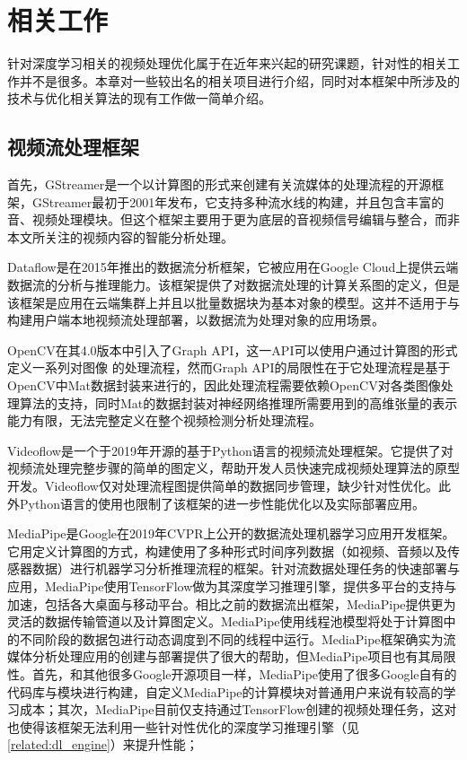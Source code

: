 
\chapter{相关工作}\label{related_work}
针对深度学习相关的视频处理优化属于在近年来兴起的研究课题，针对性的相关工作并不是很多。本章对一些较出名的相关项目进行介绍，同时对本框架中所涉及的技术与优化相关算法的现有工作做一简单介绍。

\section{视频流处理框架}
首先，GStreamer\cite{gstreamer}是一个以计算图的形式来创建有关流媒体的处理流程的开源框架，GStreamer最初于2001年发布，它支持多种流水线的构建，并且包含丰富的音、视频处理模块。但这个框架主要用于更为底层的音视频信号编辑与整合，而非本文所关注的视频内容的智能分析处理。\par
Dataflow\cite{akidau2015dataflow}是在2015年推出的数据流分析框架，它被应用在Google Cloud上提供云端数据流的分析与推理能力。该框架提供了对数据流处理的计算关系图的定义，但是该框架是应用在云端集群上并且以批量数据块为基本对象的模型。这并不适用于与构建用户端本地视频流处理部署，以数据流为处理对象的应用场景。\par 
OpenCV在其4.0版本中引入了Graph API\cite{matveev2018opencv}，这一API可以使用户通过计算图的形式定义一系列对图像
的处理流程，然而Graph API的局限性在于它处理流程是基于OpenCV中Mat数据封装来进行的，因此处理流程需要依赖OpenCV对各类图像处理算法的支持，同时Mat的数据封装对神经网络推理所需要用到的高维张量的表示能力有限，无法完整定义在整个视频检测分析处理流程。\par
Videoflow\cite{deArmas2019videoflow}是一个于2019年开源的基于Python语言的视频流处理框架。它提供了对视频流处理完整步骤的简单的图定义，帮助开发人员快速完成视频处理算法的原型开发。Videoflow仅对处理流程图提供简单的数据同步管理，缺少针对性优化。此外Python语言的使用也限制了该框架的进一步性能优化以及实际部署应用。\par
MediaPipe\cite{lugaresi2019mediapipe}是Google在2019年CVPR上公开的数据流处理机器学习应用开发框架。
它用定义计算图的方式，构建使用了多种形式时间序列数据（如视频、音频以及传感器数据）进行机器学习分析推理流程的框架。针对流数据处理任务的快速部署与应用，MediaPipe使用TensorFlow\cite{abadi2016tensorflow}做为其深度学习推理引擎，提供多平台的支持与加速，包括各大桌面与移动平台。相比之前的数据流出框架，MediaPipe提供更为灵活的数据传输管道以及计算图定义。MediaPipe使用线程池模型将处于计算图中的不同阶段的数据包进行动态调度到不同的线程中运行。MediaPipe框架确实为流媒体分析处理应用的创建与部署提供了很大的帮助，但MediaPipe项目也有其局限性。首先，和其他很多Google开源项目一样，MediaPipe使用了很多Google自有的代码库与模块进行构建，自定义MediaPipe的计算模块对普通用户来说有较高的学习成本；其次，MediaPipe目前仅支持通过TensorFlow创建的视频处理任务，这对也使得该框架无法利用一些针对性优化的深度学习推理引擎（见\ref{related:dl_engine}）来提升性能；
